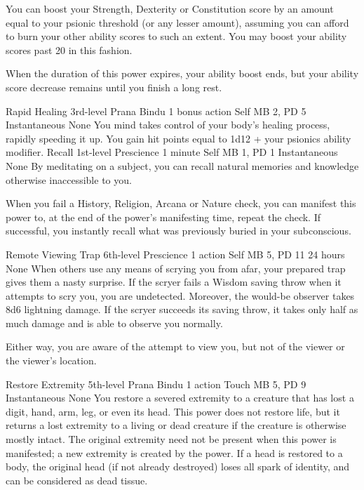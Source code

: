 You can boost your Strength, Dexterity or Constitution score
by an amount equal to your psionic threshold (or any lesser
amount), assuming you can afford to burn your other ability
scores to such an extent. You may boost your ability scores
past 20 in this fashion.

When the duration of this power expires, your ability boost
ends, but your ability score decrease remains until you
finish a long rest.

\DndPowerHeader%
    {Rapid Healing\label{pwr:rapid-healing}}
    {3rd-level Prana Bindu}
    {1 bonus action}
    {Self}
    {MB 2, PD 5}
    {Instantaneous}
    {None}
You mind takes control of your body's healing
process, rapidly speeding it up. You gain hit points equal
to 1d12 + your psionics ability modifier.
\DndPowerHeader%
    {Recall\label{pwr:recall}}
    {1st-level Prescience}
    {1 minute}
    {Self}
    {MB 1, PD 1}
    {Instantaneous}
    {None}
By meditating on a subject, you can recall
natural memories and knowledge otherwise inaccessible to you.

When you fail a History, Religion, Arcana or Nature check,
you can manifest this power to, at the end of the power's
manifesting time, repeat the check. If successful, you instantly
recall what was previously buried in your subconscious.

\DndPowerHeader%
    {Remote Viewing Trap\label{pwr:remote-viewing-trap}}
    {6th-level Prescience}
    {1 action}
    {Self}
    {MB 5, PD 11}
    {24 hours}
    {None}
When others use any means of scrying you
from afar, your prepared trap gives them a nasty surprise.
If the scryer fails a Wisdom saving throw when it attempts
to scry you, you are undetected. Moreover, the would-be observer
takes 8d6 lightning damage. If the scryer succeeds its saving
throw, it takes only half as much damage and is able to observe
you normally.

Either way, you are aware of the attempt to view you, but
not of the viewer or the viewer's location.

\DndPowerHeader%
    {Restore Extremity\label{pwr:restore-extremity}}
    {5th-level Prana Bindu}
    {1 action}
    {Touch}
    {MB 5, PD 9}
    {Instantaneous}
    {None}
You restore a severed extremity to a creature
that has lost a digit, hand, arm, leg, or even its head. This
power does not restore life, but it returns a lost extremity
to a living or dead creature if the creature is otherwise
mostly intact. The original extremity need not be present
when this power is manifested; a new extremity is created
by the power. If a head is restored to a body, the original
head (if not already destroyed) loses all spark of identity,
and can be considered as dead tissue.

